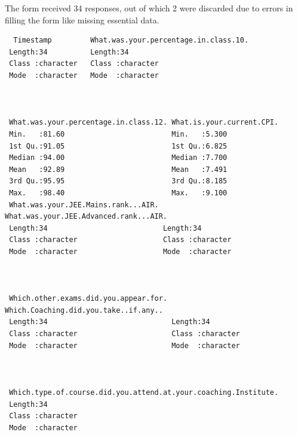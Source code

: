 \documentclass[
  letterpaper,
  DIV=11,
  numbers=noendperiod]{scrartcl}
\begin{document}
The form received 34 responses, out of which 2 were discarded due to
errors in filling the form like missing essential data.

\begin{verbatim}
  Timestamp         What.was.your.percentage.in.class.10.
 Length:34          Length:34                            
 Class :character   Class :character                     
 Mode  :character   Mode  :character                     
                                                         
                                                         
                                                         
 What.was.your.percentage.in.class.12. What.is.your.current.CPI.
 Min.   :81.60                         Min.   :5.300            
 1st Qu.:91.05                         1st Qu.:6.825            
 Median :94.00                         Median :7.700            
 Mean   :92.89                         Mean   :7.491            
 3rd Qu.:95.95                         3rd Qu.:8.185            
 Max.   :98.40                         Max.   :9.100            
 What.was.your.JEE.Mains.rank...AIR. What.was.your.JEE.Advanced.rank...AIR.
 Length:34                           Length:34                             
 Class :character                    Class :character                      
 Mode  :character                    Mode  :character                      
                                                                           
                                                                           
                                                                           
 Which.other.exams.did.you.appear.for. Which.Coaching.did.you.take..if.any..
 Length:34                             Length:34                            
 Class :character                      Class :character                     
 Mode  :character                      Mode  :character                     
                                                                            
                                                                            
                                                                            
 Which.type.of.course.did.you.attend.at.your.coaching.Institute.
 Length:34                                                      
 Class :character                                               
 Mode  :character                                               
                                                                

\end{verbatim}
\end{document}

